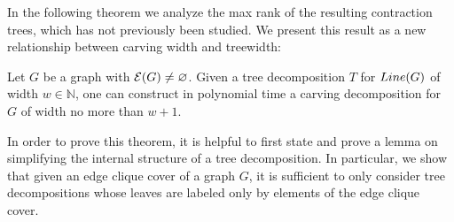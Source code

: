 In the following theorem we analyze the max rank of the resulting contraction trees, which has not previously been studied. We present this result as a new relationship between carving width and treewidth:
\begin{theorem} \label{thm:carving-equiv-tree}
	Let $G$ be a graph with $\mathcal{E}(G) \neq \varnothing$. Given a tree decomposition $T$ for $Line(G)$ of width $w \in \mathbb{N}$, one can construct in polynomial time a carving decomposition for $G$ of width no more than $w+1$.
\end{theorem}

In order to prove this theorem, it is helpful to first state and prove a lemma on simplifying the internal structure of a tree decomposition. In particular, we show that given an edge clique cover of a graph $G$, it is sufficient to only consider tree decompositions whose leaves are labeled only by elements of the edge clique cover.

